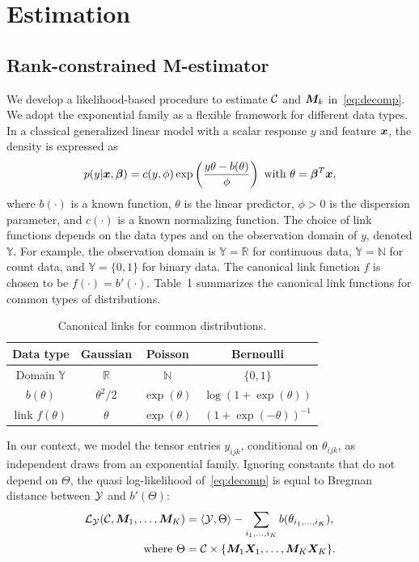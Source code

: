 \documentclass[12pt]{article}
\theoremstyle{definition}
\theoremstyle{definition}
\begin{document}
\section{Estimation}\label{sec:est}

\subsection{Rank-constrained M-estimator}
We develop a likelihood-based procedure to estimate $\mathcal{C}$ and $\bm M_k$ in~\eqref{eq:decomp}. We adopt the exponential family as a flexible framework for different data types. In a classical generalized linear model with a scalar response $y$ and feature $\bm x$, the density is expressed as
\[
p(y|\mx, \boldsymbol{\beta})=c(y,\phi)\exp\left(\frac{y\theta- b(\theta)}{\phi}\right)\ \text{with}\ \theta=\boldsymbol{\beta}^T\mx,
\]
where $b(\cdot)$ is a known function, $\theta$ is the linear predictor, $\phi>0$ is the dispersion parameter, and $c(\cdot)$ is a known normalizing function. The choice of link functions depends on the data types and on the observation domain of $y$, denoted $\mathbb{Y}$. For example, the observation domain is $\mathbb{Y}=\mathbb{R}$ for continuous data, $\mathbb{Y}=\mathbb{N}$ for count data, and  $\mathbb{Y}=\{0,1\}$ for binary data. The canonical link function $f$ is chosen to be $f(\cdot)=b'(\cdot)$. Table~1 summarizes the canonical link functions for common types of distributions. 

\begin{table}[htb]
\centering
\begin{tabular}{c|ccc}
Data type &Gaussian & Poisson& Bernoulli\\
\hline
Domain $\mathbb{Y}$& $\mathbb{R}$&$\mathbb{N}$&$\{0,1\}$\\
 $b(\theta)$&$\theta^2/2$& $\exp(\theta)$&$\log (1+\exp(\theta))$\\
 link $f(\theta)$&$\theta$&$\exp(\theta)$&$(1+\exp(-\theta))^{-1}$
\end{tabular}
\caption{Canonical links for common distributions.}\label{table:link}
\end{table}


In our context, we model the tensor entries $y_{ijk}$, conditional on $\theta_{ijk}$, as independent draws from an exponential family. Ignoring constants that do not depend on $\Theta$, the quasi log-likelihood of~\eqref{eq:decomp} is equal to Bregman distance between $\mathcal{Y}$ and $b'(\Theta)$:
\begin{align}\label{eq:loglikelihood}
\mathcal{L}_{\mathcal{Y}}(\mathcal{C},\bm M_1,\ldots,\bm M_K)&=\langle \mathcal{Y}, \Theta \rangle - \sum_{i_1,\ldots,i_K} b(\theta_{i_1,\ldots,i_K}),\notag\\
\text{where}\ \Theta&=\mathcal{C}\times\{\bm M_1\bm X_1,\ldots,\bm M_K\bm X_K\}.
\end{align}
\end{document}

